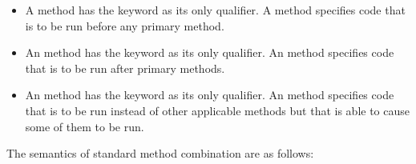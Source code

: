 \begin{itemize}

\item 
A  method has the keyword  as its
only qualifier.  A  method specifies code that is to be
run before any primary method.

\item 
An  method has the keyword  as its only
qualifier.  An  method specifies code that is to be run
after primary methods.  

\item 
An  method has the keyword  as its only
qualifier. An  method specifies code that is to
be run instead of other applicable methods but that is
able to cause some of them to be run.

\end{itemize}
The semantics of standard method combination are as follows:

